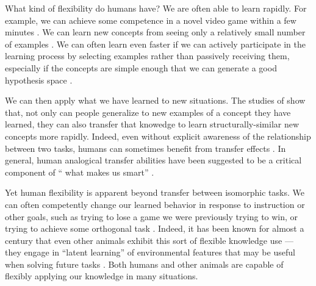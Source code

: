 What kind of flexibility do humans have? We are often able to learn rapidly. For example, we can achieve some competence in a novel video game within a few minutes \citep{Lake2016}. We can learn new concepts from seeing only a relatively small number of examples \citep[e.g.][]{Bourne1970}. We can often learn even faster if we can actively participate in the learning process by selecting examples rather than passively receiving them, especially if the concepts are simple enough that we can generate a good hypothesis space \citep{Markant2014a}. \par
We can then apply what we have learned to new situations. The studies of \citet{Bourne1970} show that, not only can people generalize to new examples of a concept they have learned, they can also transfer that knowedge to learn structurally-similar new concepts more rapidly. Indeed, even without explicit awareness of the relationship between two tasks, humans can sometimes benefit from transfer effects \citep[e.g.][]{Day2011}. In general, human analogical transfer abilities have been suggested to be a critical component of `` what makes us smart'' \citep{Gentner2003}. \par
Yet human flexibility is apparent beyond transfer between isomorphic tasks. We can often competently change our learned behavior in response to instruction or other goals, such as trying to lose a game we were previously trying to win, or trying to achieve some orthogonal task \citep{Lake2016}. Indeed, it has been known for almost a century that even other animals exhibit this sort of flexible knowledge use --- they engage in ``latent learning'' of environmental features that may be useful when solving future tasks \citep{Blodgett1929}. Both humans and other animals are capable of flexibly applying our knowledge in many situations.  \par
